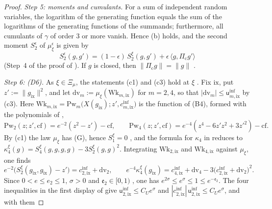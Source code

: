 \documentclass[11pt,letterpaper,reqno]{amsart}
\theoremstyle{definition}
\begin{document}
\begin{proof}
\emph{Step 5: moments and cumulants.}
For a sum of independent random variables, the logarithm of the generating function equals the sum of the logarithms of the generating functions of the summands; furthermore, all cumulants of $\gamma$ of order $3$ or more vanish.
Hence (b) holds, and the second moment $S_2^\epsilon$ of $\mu_\xi^\epsilon$ is given by
\begin{equation*}
S_2^{\epsilon}(g,g')=(1-\epsilon)\,S_2^\xi(g,g')+\epsilon\,\langle g,\Pi_{\mathrm c}g'\rangle
\end{equation*}
(Step~4 of the proof of \cite[Proposition~21.40\,(a)]{QEDI}).
If $g$ is closed, then $\|\Pi_{\mathrm c}g\|=\|g\|$ \cite[Lemma~9.12\,(a)]{QEDI}.

\emph{Step 6: (D6).}
As $\xi\in\Xi_\mu$, the statements (c1) and (c3) hold at $\xi$ \cite[Theorem~44\,(D)]{QEDIII}.
Fix $\mathrm{ix}$, put $z':=\|g_{\mathrm{ix}}\|^2$, and let $\mathrm{dv}_m:=\mu_\xi(\mathrm{Wk}_{m,\mathrm{ix}})$ for $m=2,4$, so that $|\mathrm{dv}_m|\le\mathsf u^{\mathrm{inf}}_{m,\mathrm{ix}}$ by (c3).
Here $\mathrm{Wk}_{m,\mathrm{ix}}=\allowbreak \mathrm{Pw}_m\bigl(X(g_{\mathrm{ix}});z',\allowbreak c^{\mathrm{inf}}_{m,\mathrm{ix}}\bigr)$ is the function of (B4), formed with the polynomials of \cite[Section~I.7.6]{QEDIII},
\begin{equation*}
\mathrm{Pw}_2(z;z',\mathrm{cf})=e^{-2}(z^2-z')-\mathrm{cf},\qquad\mathrm{Pw}_4(z;z',\mathrm{cf})=e^{-4}(z^4-6z'z^2+3z'^2)-\mathrm{cf}.
\end{equation*}
By (c1) the law $\mu_\xi$ has (G), hence $S_1^\xi=0$ \cite[Proposition~45.2\,(1), (8)]{QEDIII}, and the formula for $\kappa_4$ in \cite[(n5)]{QEDIII} reduces to $\kappa_4^\xi(g)=S_4^\xi(g,g,g,g)-3S_2^\xi(g,g)^2$.
Integrating $\mathrm{Wk}_{2,\mathrm{ix}}$ and $\mathrm{Wk}_{4,\mathrm{ix}}$ against $\mu_\xi$, one finds
\begin{equation*}
e^{-2}\bigl(S_2^\xi(g_{\mathrm{ix}},g_{\mathrm{ix}})-z'\bigr)=c^{\mathrm{inf}}_{2,\mathrm{ix}}+\mathrm{dv}_2,\qquad e^{-4}\kappa_4^\xi(g_{\mathrm{ix}})=c^{\mathrm{inf}}_{4,\mathrm{ix}}+\mathrm{dv}_4-3\bigl(c^{\mathrm{inf}}_{2,\mathrm{ix}}+\mathrm{dv}_2\bigr)^2.
\end{equation*}
Since $0<e\le e_2\le1$, $\sigma>0$ and $\mathfrak e_2\in[0,1)$ \cite[Proposition~43.2]{QEDIII}, one has $e^{2\sigma}\le e^\sigma\le1\le e^{-\mathfrak e_2}$.
The four inequalities in the first display of \cite[Theorem~44\,(B4)]{QEDIII} give $\mathsf u^{\mathrm{inf}}_{2,\mathrm{ix}}\le C_Ue^\sigma$ and $|c^{\mathrm{inf}}_{2,\mathrm{ix}}|\,\allowbreak \mathsf u^{\mathrm{inf}}_{2,\mathrm{ix}}\le C_Ue^\sigma$, and with them

\end{proof}
\end{document}
